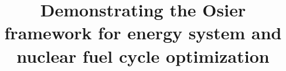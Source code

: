 \documentclass[review,12pt]{elsarticle}
\begin{document}
\begin{frontmatter}

\title{Demonstrating the Osier framework for energy system and nuclear fuel cycle optimization}












\end{frontmatter}



\begin{linenumbers}






% 
\end{linenumbers}

 

\end{document}
